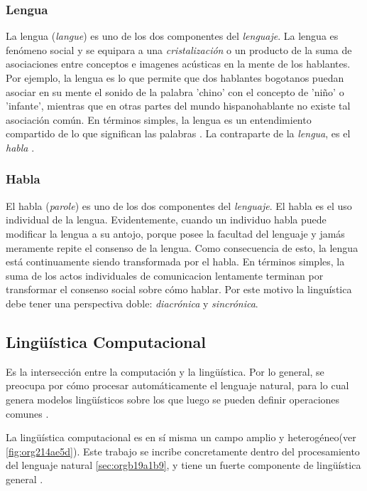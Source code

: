 \documentclass[12pt,letterpaper,twoside]{article}
\begin{document}
\subsubsection{Lengua}
\label{sec:org581fd04}

La lengua (\emph{langue}) es uno de los dos componentes del
\emph{lenguaje}.  La lengua es fenómeno social y se equipara a una
\emph{cristalización} o un producto de la suma de asociaciones entre
conceptos e imagenes acústicas en la mente de los hablantes. Por
ejemplo, la lengua es lo que permite que dos hablantes bogotanos
puedan asociar en su mente el sonido de la palabra 'chino' con el
concepto de 'niño' o 'infante', mientras que en otras partes del
mundo hispanohablante no existe tal asociación común.  En
términos simples, la lengua es un entendimiento compartido de lo
que significan las palabras \cite[pg. 102]{alonso1945curso}. La
contraparte de la \emph{lengua}, es el \emph{habla} .

\subsubsection{Habla}
\label{sec:org06288c6}
El habla (\emph{parole}) es uno de los dos componentes del
\emph{lenguaje}. El habla es el uso individual de la lengua.
Evidentemente, cuando un individuo habla puede modificar
la lengua a su antojo, porque posee la facultad del
lenguaje y jamás meramente repite el consenso de la lengua.
Como consecuencia de esto, la lengua está continuamente
siendo transformada por el habla. En términos simples,
la suma de los actos individuales de comunicacion lentamente
terminan por transformar el consenso social sobre cómo
hablar.  Por este motivo la linguística debe tener una
perspectiva doble: \emph{diacrónica} y \emph{sincrónica}.


\subsection{Lingüística Computacional}
\label{sec:orgd362cf4}

Es la intersección entre la computación y la lingüística. Por lo
general, se preocupa por cómo procesar automáticamente el
lenguaje natural, para lo cual genera modelos lingüísticos sobre los
que luego se pueden definir operaciones comunes \cite{gelbukh2004}.


La lingüística computacional es en sí misma un campo amplio y
heterogéneo(ver \ref{fig:org214ae5d}).
Este trabajo se incribe concretamente dentro del procesamiento
del lenguaje natural \ref{sec:orgb19a1b9}, y tiene un fuerte componente de
lingüística general .
\end{document}
